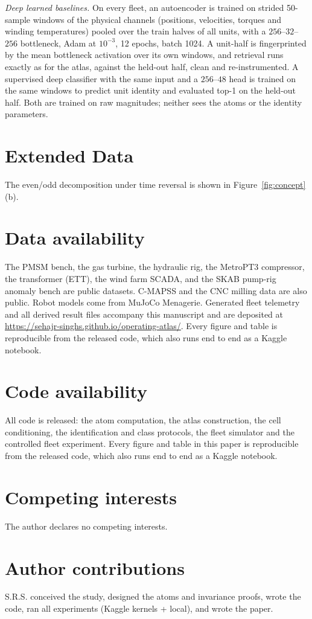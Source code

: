 \documentclass[11pt]{article}
\begin{document}
\emph{Deep learned baselines.} On every fleet, an autoencoder is trained on
strided 50-sample windows of the physical channels (positions, velocities,
torques and winding temperatures) pooled over the train halves of all units,
with a $256$--$32$--$256$ bottleneck, Adam at $10^{-3}$, 12 epochs, batch
1024. A unit-half is fingerprinted by the mean bottleneck activation over its
own windows, and retrieval runs exactly as for the atlas, against the held-out
half, clean and re-instrumented. A supervised deep classifier with the same
input and a $256$--$48$ head is trained on the same windows to predict unit
identity and evaluated top-1 on the held-out half. Both are trained on raw
magnitudes; neither sees the atoms or the identity parameters.

\section*{Extended Data}

The even/odd decomposition under time reversal is shown in Figure~\ref{fig:concept}(b).

\section*{Data availability}The PMSM bench\cite{pmsm_data}, the gas turbine\cite{muniryadi2022}, the
hydraulic rig\cite{helwig2022}, the MetroPT3 compressor\cite{cardoso2020},
the transformer (ETT)\cite{zhou2021}, the wind farm SCADA\cite{zahedi2018},
and the SKAB pump-rig anomaly bench\cite{skab2020} are public datasets.
C-MAPSS\cite{saxena2008} and the CNC milling data\cite{goecks2019} are also
public. Robot models come from MuJoCo Menagerie\cite{guo2022}. Generated
fleet telemetry and all derived result files accompany this manuscript and are
deposited at \url{https://sehajr-singhs.github.io/operating-atlas/}.
Every figure and table is reproducible from the released code, which also runs
end to end as a Kaggle notebook.

\section*{Code availability}

All code is released: the atom computation, the atlas construction, the cell
conditioning, the identification and class protocols, the fleet simulator and
the controlled fleet experiment. Every figure and table in this paper is
reproducible from the released code, which also runs end to end as a Kaggle
notebook.

\section*{Competing interests}

The author declares no competing interests.

\section*{Author contributions}

S.R.S. conceived the study, designed the atoms and invariance proofs, wrote the
code, ran all experiments (Kaggle kernels + local), and wrote the paper.
\end{document}
